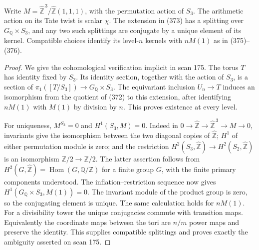 \begin{proposition}
\label{E-equivariant}
Write $M=\widehat{\mathbb Z}^{\,3}/\widehat{\mathbb Z}(1,1,1)$,
with the permutation action of $S_3$. The arithmetic action
on its Tate twist is scalar $\chi$.
The extension in (373) has a splitting over
$G_{\mathbb Q}\times S_3$, and any two such splittings
are conjugate by a unique element of its kernel.
Compatible choices identify its level-$n$ kernels with $nM(1)$
as in (375)--(376).
\end{proposition}
\begin{proof}
We give the cohomological verification implicit in scan 175.
The torus $T$ has identity fixed by $S_3$. Its identity
section, together with the action of $S_3$, is a section
of $\pi_1([T/S_3])\to G_{\mathbb Q}\times S_3$.
The equivariant inclusion $U_n\to T$ induces an isomorphism
from the quotient of (372) to this extension, after
identifying $nM(1)$ with $M(1)$ by division by $n$.
This proves existence at every level.

For uniqueness, $M^{S_3}=0$ and $H^1(S_3,M)=0$.
Indeed in
$0\to\widehat{\mathbb Z}\to\widehat{\mathbb Z}^{\,3}
\to M\to0$, invariants give the isomorphism between
the two diagonal copies of $\widehat{\mathbb Z}$;
$H^1$ of either permutation module is zero; and the
restriction
$H^2(S_3,\widehat{\mathbb Z})\to
 H^2(S_2,\widehat{\mathbb Z})$
is an isomorphism $\mathbb Z/2\to\mathbb Z/2$.
The latter assertion follows from
$H^2(G,\widehat{\mathbb Z})
=\operatorname{Hom}(G,\mathbb Q/\mathbb Z)$
for a finite group $G$, with the finite primary
components understood. The inflation--restriction
sequence now gives
$H^1(G_{\mathbb Q}\times S_3,M(1))=0$.
The invariant module of the product group is zero,
so the conjugating element is unique.
The same calculation holds for $nM(1)$.
For a divisibility tower the unique conjugacies commute
with transition maps. Equivalently the coordinate maps
between the tori are $n/m$ power maps and preserve the
identity. This supplies compatible splittings and
proves exactly the ambiguity asserted on scan 175.
\end{proof}

